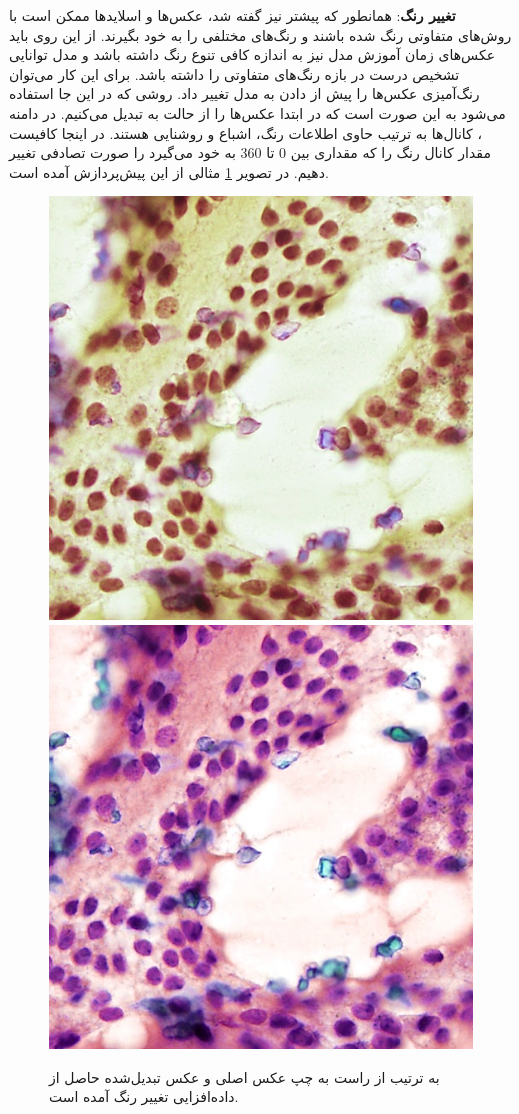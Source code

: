 \textbf{تغییر رنگ}:
همانطور که پیشتر نیز گفته شد، عکس‌ها و اسلاید‌ها ممکن است با روش‌های متفاوتی رنگ شده باشند و رنگ‌های مختلفی را به خود بگیرند.
از این روی باید عکس‌های زمان آموزش مدل نیز به اندازه کافی تنوع رنگ داشته باشد و مدل توانایی تشخیص درست در بازه رنگ‌های متفاوتی را داشته باشد.
برای این کار می‌توان رنگ‌آمیزی عکس‌ها را پیش از دادن به مدل تغییر داد.
روشی که در این جا استفاده می‌شود به این صورت است که در ابتدا عکس‌ها را از حالت  به  تبدیل می‌کنیم.
در دامنه ، کانال‌ها به ترتیب حاوی اطلاعات رنگ، اشباع و روشنایی هستند.
در اینجا کافیست مقدار کانال رنگ را که مقداری بین 0 تا 360 به خود می‌گیرد را صورت تصادفی تغییر دهیم.
در تصویر \ref{jitter augmentation} مثالی از این پیش‌پردازش آمده است.
\begin{figure}
    \begin{center}
        \includegraphics[width=0.48\linewidth]{figs/suggested_methods/subs/data_augmentation/jitter_1054-original.jpeg}
        \includegraphics[width=0.48\linewidth]{figs/suggested_methods/subs/data_augmentation/jitter_1054-transformed.jpeg}
    \end{center}
    \caption[نمونه‌ای از داده‌افزایی تغییر رنگ]{ به ترتیب از راست به چپ عکس اصلی و عکس تبدیل‌شده حاصل از داده‌افزایی تغییر رنگ آمده است.}
    \label{jitter augmentation}
\end{figure}

